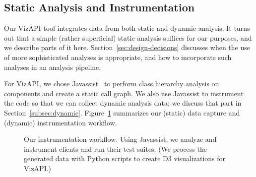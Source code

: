 \subsection{Static Analysis and Instrumentation}
\label{subsec:static}
Our VizAPI tool integrates data from both static and dynamic analysis.
It turns out that a simple (rather superficial) static analysis suffices
for our purposes, and we describe parts of it here. Section~\ref{sec:design-decisions}
discusses when the use of more sophisticated analyses is appropriate, and
how to incorporate such analyses in an analysis pipeline.

For VizAPI, we chose Javassist~\cite{chiba00:_load_struc_reflec_java} to
perform class hierarchy analysis on components and create a static call
graph. We also use Javassist to instrument the code so that we can
collect dynamic analysis data; we discuss that part in
Section~\ref{subsec:dynamic}. Figure~\ref{fig:workflow} summarizes our
(static) data capture and (dynamic) instrumentation workflow.  \\

\begin{figure}[h]
 \begin{center}
  \caption{Our instrumentation workflow. Using Javassist, we analyze and instrument clients and run their test suites. (We process the generated data with Python scripts to create D3 visualizations for VizAPI.)}
  \label{fig:workflow}
 \end{center}
\end{figure}


